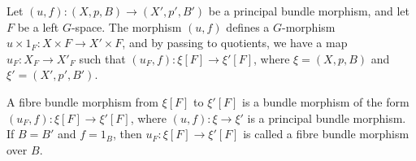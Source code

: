 Let $(u, f): (X, p, B) \to (X', p', B')$ be a principal bundle morphism, and let $F$ be a left $G$-space. The morphism $(u, f)$ defines a $G$-morphism $u \times 1_F: X \times F \to X' \times F$, and by passing to quotients, we have a map $u_F: X_F \to X'_F$ such that $(u_F, f): \xi[F] \to \xi'[F]$, where $\xi = (X, p, B)$ and $\xi' = (X', p', B')$.

A fibre bundle morphism from $\xi[F]$ to $\xi'[F]$ is a bundle morphism of the form $(u_F, f): \xi[F] \to \xi'[F]$, where $(u, f): \xi \to \xi'$ is a principal bundle morphism. If $B = B'$ and $f = 1_B$, then $u_F: \xi[F] \to \xi'[F]$ is called a fibre bundle morphism over $B$.
